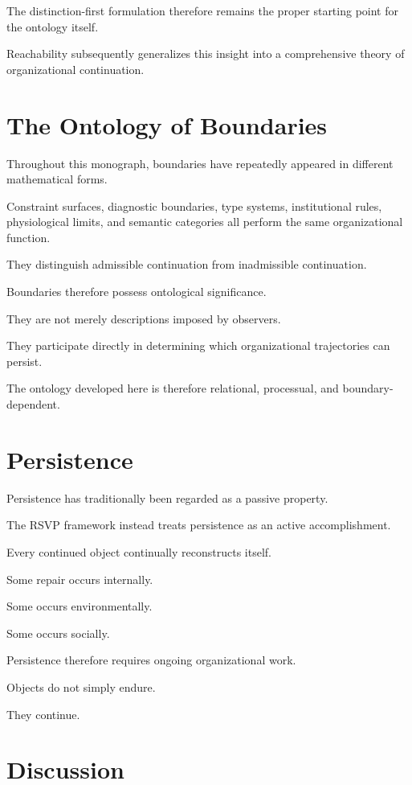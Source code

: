 \documentclass[11pt,oneside]{book}
\numberwithin{equation}{chapter}
\theoremstyle{definition}
\theoremstyle{plain}
\begin{document}
The distinction-first formulation therefore remains the proper starting
point for the ontology itself.

Reachability subsequently generalizes this insight into a comprehensive
theory of organizational continuation.

\section{The Ontology of Boundaries}

Throughout this monograph, boundaries have repeatedly appeared in different
mathematical forms.

Constraint surfaces, diagnostic boundaries, type systems, institutional
rules, physiological limits, and semantic categories all perform the same
organizational function.

They distinguish admissible continuation from inadmissible continuation.

Boundaries therefore possess ontological significance.

They are not merely descriptions imposed by observers.

They participate directly in determining which organizational trajectories
can persist.

The ontology developed here is therefore relational, processual, and
boundary-dependent.

\section{Persistence}

Persistence has traditionally been regarded as a passive property.

The RSVP framework instead treats persistence as an active accomplishment.

Every continued object continually reconstructs itself.

Some repair occurs internally.

Some occurs environmentally.

Some occurs socially.

Persistence therefore requires ongoing organizational work.

Objects do not simply endure.

They continue.

\section{Discussion}
\end{document}
